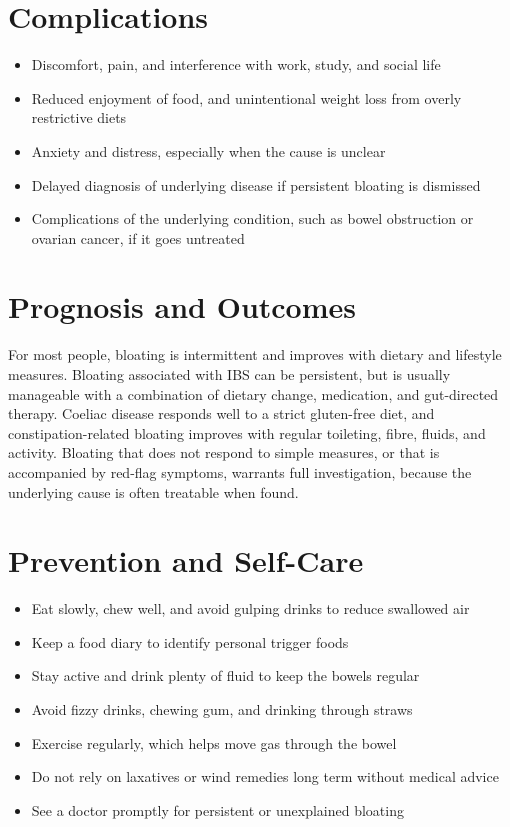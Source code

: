 \section*{Complications}
\begin{itemize}
    \item Discomfort, pain, and interference with work, study, and social life
    \item Reduced enjoyment of food, and unintentional weight loss from overly restrictive diets
    \item Anxiety and distress, especially when the cause is unclear
    \item Delayed diagnosis of underlying disease if persistent bloating is dismissed
    \item Complications of the underlying condition, such as bowel obstruction or ovarian cancer, if it goes untreated
\end{itemize}

\section*{Prognosis and Outcomes}
For most people, bloating is intermittent and improves with dietary and lifestyle measures. Bloating associated with IBS can be persistent, but is usually manageable with a combination of dietary change, medication, and gut-directed therapy. Coeliac disease responds well to a strict gluten-free diet, and constipation-related bloating improves with regular toileting, fibre, fluids, and activity. Bloating that does not respond to simple measures, or that is accompanied by red-flag symptoms, warrants full investigation, because the underlying cause is often treatable when found.

\section*{Prevention and Self-Care}
\begin{itemize}
    \item Eat slowly, chew well, and avoid gulping drinks to reduce swallowed air
    \item Keep a food diary to identify personal trigger foods
    \item Stay active and drink plenty of fluid to keep the bowels regular
    \item Avoid fizzy drinks, chewing gum, and drinking through straws
    \item Exercise regularly, which helps move gas through the bowel
    \item Do not rely on laxatives or wind remedies long term without medical advice
    \item See a doctor promptly for persistent or unexplained bloating
\end{itemize}


